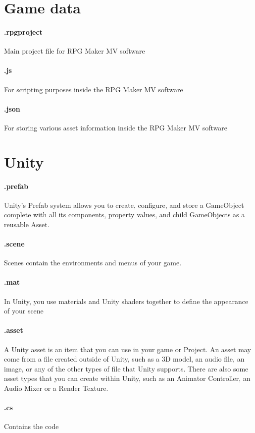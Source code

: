 \section{Game data}
\paragraph{.rpgproject}
		 Main project file for RPG Maker MV software 

\paragraph{.js}
	 For scripting purposes inside the RPG Maker MV software

\paragraph{.json}
	 For storing various asset information inside the RPG Maker MV software

\section{Unity}

\paragraph{.prefab} Unity’s Prefab system allows you to create, configure, and store a GameObject complete with all its components, property values, and child GameObjects
 as a reusable Asset.
\paragraph{.scene} Scenes contain the environments and menus of your game.
\paragraph{.mat} In Unity, you use materials and Unity shaders together to define the appearance of your scene
\paragraph{.asset}A Unity asset is an item that you can use in your game or Project. An asset may come from a file created outside of Unity, such as a 3D model, an audio file, an image, or any of the other types of file that Unity supports. There are also some asset types that you can create within Unity, such as an Animator Controller, an Audio Mixer or a Render Texture.
\paragraph{.cs} Contains the code









\pagebreak